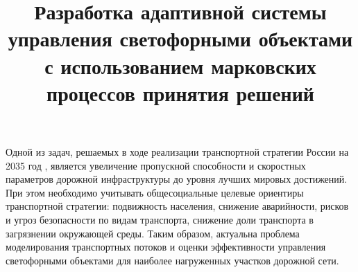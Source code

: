\documentclass[11pt]{ubs}
\title{Разработка адаптивной системы управления светофорными объектами с использованием марковских процессов принятия решений}%
\begin{document}
\maketitle

Одной из задач, решаемых в ходе реализации транспортной стратегии России на 2035 год \cite{transp_strat}, является увеличение пропускной способности и  скоростных параметров дорожной инфраструктуры до уровня лучших мировых достижений. При этом необходимо
учитывать  общесоциальные целевые ориентиры транспортной стратегии: подвижность населения, снижение аварийности, рисков и угроз безопасности по видам транспорта, снижение доли транспорта в загрязнении окружающей среды. Таким образом, актуальна проблема моделирования  транспортных потоков и оценки эффективности управления
светофорными объектами для наиболее нагруженных участков дорожной сети. %
\end{document}
